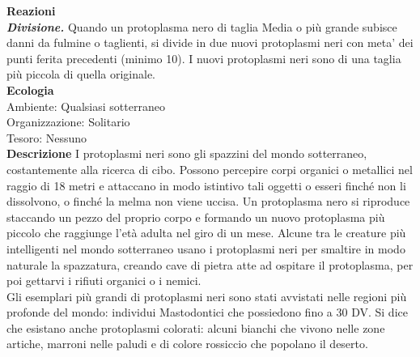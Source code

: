 \begin{multicols}{2}
\textbf{Reazioni}\\
\emph{\textbf{Divisione.}} Quando un protoplasma nero di taglia Media o più grande subisce danni da fulmine o taglienti, si divide in due nuovi protoplasmi neri con meta' dei punti ferita precedenti (minimo 10). I nuovi protoplasmi neri sono di una taglia più piccola di quella originale. \\
\textbf{Ecologia}\\
Ambiente: Qualsiasi sotterraneo\\
Organizzazione: Solitario\\
Tesoro: Nessuno\\
\textbf{Descrizione}
I protoplasmi neri sono gli spazzini del mondo sotterraneo, costantemente alla ricerca di cibo. Possono percepire corpi organici o metallici nel raggio di 18 metri e attaccano in modo istintivo tali oggetti o esseri finché non li dissolvono, o finché la melma non viene uccisa. Un protoplasma nero si riproduce staccando un pezzo del proprio corpo e formando un nuovo protoplasma più piccolo che raggiunge l'età adulta nel giro di un mese. Alcune tra le creature più intelligenti nel mondo sotterraneo usano i protoplasmi neri per smaltire in modo naturale la spazzatura, creando cave di pietra atte ad ospitare il protoplasma, per poi gettarvi i rifiuti organici o i nemici.\\
Gli esemplari più grandi di protoplasmi neri sono stati avvistati nelle regioni più profonde del mondo: individui Mastodontici che possiedono fino a 30 DV. Si dice che esistano anche protoplasmi colorati: alcuni bianchi che vivono nelle zone artiche, marroni nelle paludi e di colore rossiccio che popolano il deserto.\\



\end{multicols}

